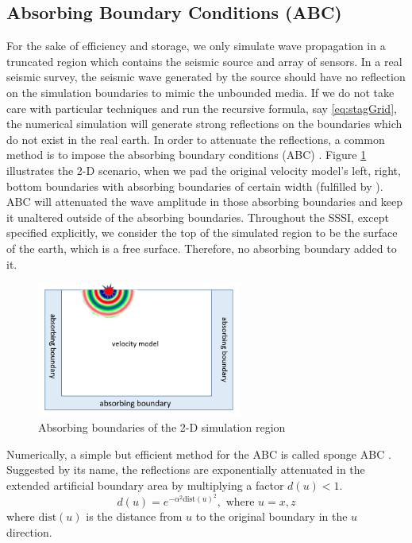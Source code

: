 \documentclass[11pt]{article}
\theoremstyle{plain}
\theoremstyle{definition}
\theoremstyle{remark}
\numberwithin{equation}{section}
\begin{document}
\subsection{Absorbing Boundary Conditions (ABC)}
For the sake of efficiency and storage, we only simulate wave propagation in a truncated region which contains the seismic source and array of sensors. In a real seismic survey, the seismic wave generated by the source should have no reflection on the simulation boundaries to mimic the unbounded media. If we do not take care with particular techniques and run the recursive formula, say \eqref{eq:stagGrid}, the numerical simulation will generate strong reflections on the boundaries which do not exist in the real earth. In order to attenuate the reflections, a common method is to impose the absorbing boundary conditions (ABC) \cite{Engquist:1977aa, Clayton:1977aa}. Figure \ref{fig:ABC} illustrates the 2-D scenario, when we pad the original velocity model's left, right, bottom boundaries with absorbing boundaries of certain width (fulfilled by ). ABC will attenuated the wave amplitude in those absorbing boundaries and keep it unaltered outside of the absorbing boundaries. Throughout the SSSI, except specified explicitly, we consider the top of the simulated region to be the surface of the earth, which is a free surface. Therefore, no absorbing boundary added to it.

\begin{figure}[htbp]
\centering
\includegraphics[width=0.6\textwidth]{Fig/abc.png}
\caption{Absorbing boundaries of the 2-D simulation region}
\label{fig:ABC}
\end{figure}

Numerically, a simple but efficient method for the ABC is called sponge ABC \cite{Cerjan:1985aa}. Suggested by its name, the reflections are exponentially attenuated in the extended artificial boundary area by multiplying a factor $d(u) < 1$.
\begin{equation}
  d(u) = e^{-\alpha^2\text{dist}(u)^2}, \mbox{  where  } u=x, z
\end{equation}
where $\text{dist}(u)$ is the distance from $u$ to the original boundary in the $u$ direction. 
\end{document}
